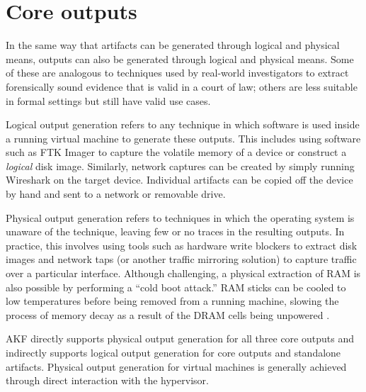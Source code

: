 \documentclass[letterpaper,12pt]{report}
\begin{document}
\section{Core outputs}\label{core-outputs}

In the same way that artifacts can be generated through logical and
physical means, outputs can also be generated through logical and
physical means. Some of these are analogous to techniques used by
real-world investigators to extract forensically sound evidence that is
valid in a court of law; others are less suitable in formal settings but
still have valid use cases.

Logical output generation refers to any technique in which software is
used inside a running virtual machine to generate these outputs. This
includes using software such as FTK Imager
\cite{exterroFTKImagerForensic} to capture the volatile memory of a
device or construct a \emph{logical} disk image. Similarly, network
captures can be created by simply running Wireshark on the target
device. Individual artifacts can be copied off the device by hand and
sent to a network or removable drive.

Physical output generation refers to techniques in which the operating
system is unaware of the technique, leaving few or no traces in the
resulting outputs. In practice, this involves using tools such as
hardware write blockers to extract disk images and network taps (or
another traffic mirroring solution) to capture traffic over a particular
interface. Although challenging, a physical extraction of RAM is also
possible by performing a ``cold boot attack.'' RAM sticks can be cooled
to low temperatures before being removed from a running machine, slowing
the process of memory decay as a result of the DRAM cells being
unpowered \cite{yitbarekColdBootAttacks2017}.

AKF directly supports physical output generation for all three core
outputs and indirectly supports logical output generation for core
outputs and standalone artifacts. Physical output generation for virtual
machines is generally achieved through direct interaction with the
hypervisor.
\end{document}
